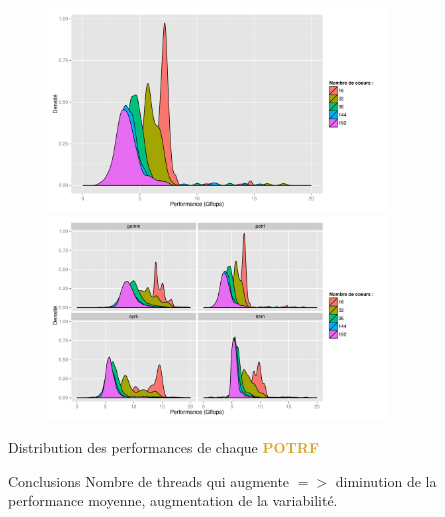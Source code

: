 \documentclass[xcolor={usenames,dvipsnames,svgnames,table}, aspectratio=43]{beamer}
\newcommand{\potrfcolor}[1]{\textcolor{Goldenrod}{\textbf{#1}}\xspace}
\newcommand{\potrf}{\potrfcolor{POTRF}}
\begin{document}
\begin{frame}
\begin{figure}
{    }%
     {%
      \includegraphics[width=0.8\textwidth]{graph/anim-distrib/graph_anim_distrib_4.pdf}%
    }%
     {%
      \includegraphics[width=0.8\textwidth]{graph/graph_distrib_overview.pdf}%
    }%

  \end{figure}
   {
    Distribution des performances de chaque \potrf
  }
   {
    \begin{block}{Conclusions}
      Nombre de threads qui augmente $=>$ diminution de la performance moyenne, augmentation de la variabilité.
    \end{block}
  }
\end{frame}
\end{document}
